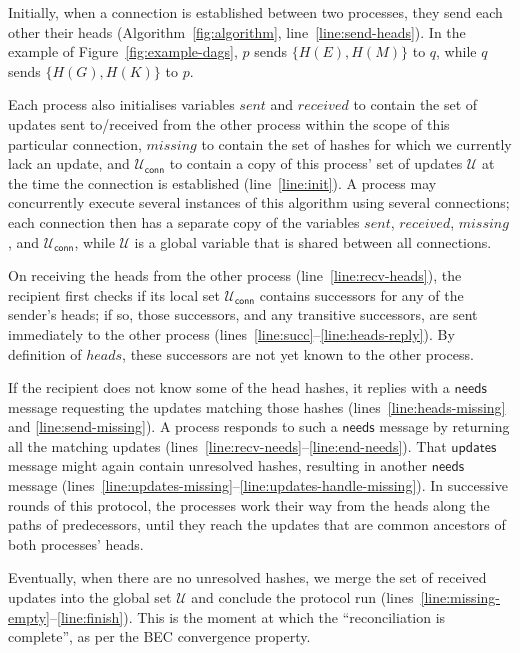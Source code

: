 \documentclass[a4paper,anonymous,USenglish]{lipics-v2019}
\begin{document}
Initially, when a connection is established between two processes, they send each other their heads (Algorithm~\ref{fig:algorithm}, line~\ref{line:send-heads}).
In the example of Figure~\ref{fig:example-dags}, $p$ sends $\{H(E),H(M)\}$ to $q$, while $q$ sends $\{H(G),H(K)\}$ to $p$.

Each process also initialises variables $\mathit{sent}$ and $\mathit{received}$ to contain the set of updates sent to/received from the other process within the scope of this particular connection, $\mathit{missing}$ to contain the set of hashes for which we currently lack an update, and $\mathcal{U}_\mathsf{conn}$ to contain a copy of this process' set of updates $\mathcal{U}$ at the time the connection is established (line~\ref{line:init}).
A process may concurrently execute several instances of this algorithm using several connections; each connection then has a separate copy of the variables $\mathit{sent}$, $\mathit{received}$, $\mathit{missing}$, and $\mathcal{U}_\mathsf{conn}$, while $\mathcal{U}$ is a global variable that is shared between all connections.

On receiving the heads from the other process (line~\ref{line:recv-heads}), the recipient first checks if its local set $\mathcal{U}_\mathsf{conn}$ contains successors for any of the sender's heads; if so, those successors, and any transitive successors, are sent immediately to the other process (lines~\ref{line:succ}--\ref{line:heads-reply}).
By definition of $\mathit{heads}$, these successors are not yet known to the other process.

If the recipient does not know some of the head hashes, it replies with a $\mathsf{needs}$ message requesting the updates matching those hashes (lines~\ref{line:heads-missing} and \ref{line:send-missing}).
A process responds to such a $\mathsf{needs}$ message by returning all the matching updates (lines~\ref{line:recv-needs}--\ref{line:end-needs}).
That $\mathsf{updates}$ message might again contain unresolved hashes, resulting in another $\mathsf{needs}$ message (lines~\ref{line:updates-missing}--\ref{line:updates-handle-missing}).
In successive rounds of this protocol, the processes work their way from the heads along the paths of predecessors, until they reach the updates that are common ancestors of both processes' heads.

Eventually, when there are no unresolved hashes, we merge the set of received updates into the global set $\mathcal{U}$ and conclude the protocol run (lines~\ref{line:missing-empty}--\ref{line:finish}).
This is the moment at which the ``reconciliation is complete'', as per the BEC convergence property.
\end{document}
